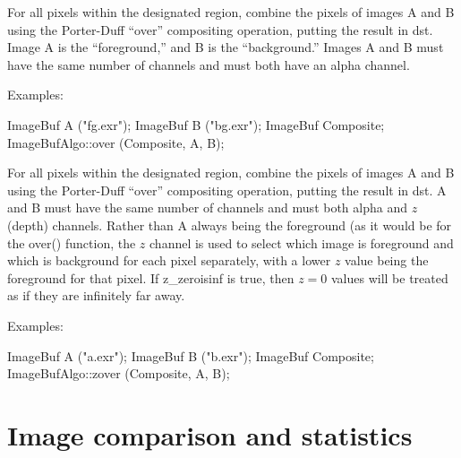  

For all pixels within the designated region, combine the pixels of
images {\cf A} and {\cf B} using the Porter-Duff ``over'' compositing
operation, putting the result in {\cf dst}.  Image {\cf A} is the
``foreground,'' and {\cf B} is the ``background.''  Images {\cf A} and
{\cf B} must have the same number of channels and must both have an
alpha channel.

\smallskip
\noindent Examples:
\begin{code}
    ImageBuf A ("fg.exr");
    ImageBuf B ("bg.exr");
    ImageBuf Composite;
    ImageBufAlgo::over (Composite, A, B);
\end{code}
\apiend


 

For all pixels within the designated region, combine the pixels of
images {\cf A} and {\cf B} using the Porter-Duff ``over'' compositing
operation, putting the result in {\cf dst}.  {\cf A} and {\cf B} must
have the same number of channels and must both alpha and $z$ (depth)
channels. Rather than {\cf A} always being the foreground (as it would
be for the {\cf over()} function, the $z$ channel is used to select
which image is foreground and which is background for each pixel
separately, with a lower $z$ value being the foreground for that pixel.
If {\cf z_zeroisinf} is {\cf true}, then $z=0$ values will be treated
as if they are infinitely far away.

\smallskip
\noindent Examples:
\begin{code}
    ImageBuf A ("a.exr");
    ImageBuf B ("b.exr");
    ImageBuf Composite;
    ImageBufAlgo::zover (Composite, A, B);
\end{code}
\apiend


\section{Image comparison and statistics}
\label{sec:iba:stats}

 
\label{sec:iba:computePixelStats}


